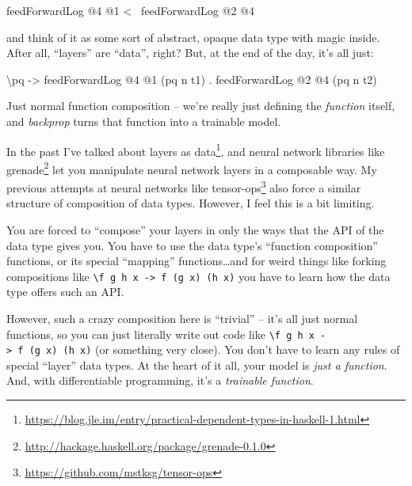 \documentclass[]{article}
\newenvironment{Shaded}{}{}
\newcommand{\DecValTok}[1]{\textcolor[rgb]{0.25,0.63,0.44}{#1}}
\newcommand{\FunctionTok}[1]{\textcolor[rgb]{0.02,0.16,0.49}{#1}}
\newcommand{\NormalTok}[1]{#1}
\newcommand{\OtherTok}[1]{\textcolor[rgb]{0.00,0.44,0.13}{#1}}
\renewcommand{\href}[2]{#2\footnote{\url{#1}}}
\begin{document}
\begin{Shaded}
\begin{Highlighting}[]
\NormalTok{feedForwardLog }\FunctionTok{@}\DecValTok{4} \FunctionTok{@}\DecValTok{1} \FunctionTok{<~}\NormalTok{ feedForwardLog }\FunctionTok{@}\DecValTok{2} \FunctionTok{@}\DecValTok{4}
\end{Highlighting}
\end{Shaded}

and think of it as some sort of abstract, opaque data type with magic inside.
After all, ``layers'' are ``data'', right? But, at the end of the day, it's all
just:

\begin{Shaded}
\begin{Highlighting}[]
\NormalTok{\textbackslash{}pq }\OtherTok{->}\NormalTok{ feedForwardLog }\FunctionTok{@}\DecValTok{4} \FunctionTok{@}\DecValTok{1}\NormalTok{ (pq }\FunctionTok{^^.}\NormalTok{ t1) }\FunctionTok{.}\NormalTok{ feedForwardLog }\FunctionTok{@}\DecValTok{2} \FunctionTok{@}\DecValTok{4}\NormalTok{ (pq }\FunctionTok{^^.}\NormalTok{ t2)}
\end{Highlighting}
\end{Shaded}

Just normal function composition -- we're really just defining the
\emph{function} itself, and \emph{backprop} turns that function into a trainable
model.

In the past I've talked about
\href{https://blog.jle.im/entry/practical-dependent-types-in-haskell-1.html}{layers
as data}, and neural network libraries like
\href{http://hackage.haskell.org/package/grenade-0.1.0}{grenade} let you
manipulate neural network layers in a composable way. My previous attempts at
neural networks like \href{https://github.com/mstksg/tensor-ops}{tensor-ops}
also force a similar structure of composition of data types. However, I feel
this is a bit limiting.

You are forced to ``compose'' your layers in only the ways that the API of the
data type gives you. You have to use the data type's ``function composition''
functions, or its special ``mapping'' functions\ldots{}and for weird things like
forking compositions like
\texttt{\textbackslash{}f\ g\ h\ x\ -\textgreater{}\ f\ (g\ x)\ (h\ x)} you have
to learn how the data type offers such an API.

However, such a crazy composition here is ``trivial'' -- it's all just normal
functions, so you can just literally write out code like
\texttt{\textbackslash{}f\ g\ h\ x\ -\textgreater{}\ f\ (g\ x)\ (h\ x)} (or
something very close). You don't have to learn any rules of special ``layer''
data types. At the heart of it all, your model is \emph{just a function}. And,
with differentiable programming, it's a \emph{trainable function}.
\end{document}
